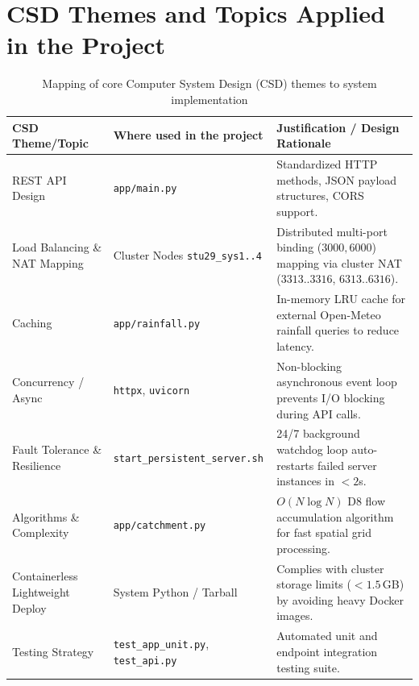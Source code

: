 \documentclass[manuscript,screen,review]{acmart}
\begin{document}
\section{CSD Themes and Topics Applied in the Project}
\label{sec:csd-themes}

\begin{table}[t]
  \caption{Mapping of core Computer System Design (CSD) themes to system implementation}
  \label{tab:csd-themes}
  \begin{tabular}{p{3.2cm}p{4.5cm}p{6.8cm}}
    \toprule
    CSD Theme/Topic & Where used in the project & Justification / Design Rationale \\
    \midrule
    REST API Design & \texttt{app/main.py} & Standardized HTTP methods, JSON payload structures, CORS support. \\
    Load Balancing \& NAT Mapping & Cluster Nodes \texttt{stu29\_sys1..4} & Distributed multi-port binding ($3000, 6000$) mapping via cluster NAT ($3313..3316$, $6313..6316$). \\
    Caching & \texttt{app/rainfall.py} & In-memory LRU cache for external Open-Meteo rainfall queries to reduce latency. \\
    Concurrency / Async & \texttt{httpx}, \texttt{uvicorn} & Non-blocking asynchronous event loop prevents I/O blocking during API calls. \\
    Fault Tolerance \& Resilience & \texttt{start\_persistent\_server.sh} & 24/7 background watchdog loop auto-restarts failed server instances in $<2$s. \\
    Algorithms \& Complexity & \texttt{app/catchment.py} & $O(N \log N)$ D8 flow accumulation algorithm for fast spatial grid processing. \\
    Containerless Lightweight Deploy & System Python / Tarball & Complies with cluster storage limits ($<1.5$\,GB) by avoiding heavy Docker images. \\
    Testing Strategy & \texttt{test\_app\_unit.py}, \texttt{test\_api.py} & Automated unit and endpoint integration testing suite. \\
    \bottomrule
  \end{tabular}
\end{table}
\end{document}
